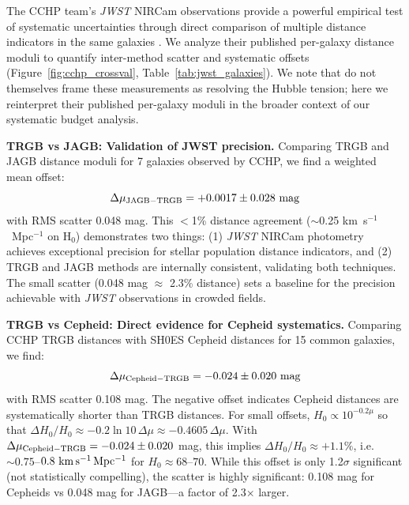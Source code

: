 \documentclass[preprint, linenumbers]{aastex701}
\begin{document}
The CCHP team's \textit{JWST} NIRCam observations provide a powerful empirical test of systematic uncertainties through direct comparison of multiple distance indicators in the same galaxies \citep{Freedman2025a}. We analyze their published per-galaxy distance moduli to quantify inter-method scatter and systematic offsets (Figure~\ref{fig:cchp_crossval}, Table~\ref{tab:jwst_galaxies}). We note that \citet{Freedman2025a} do not themselves frame these measurements as resolving the Hubble tension; here we reinterpret their published per-galaxy moduli in the broader context of our systematic budget analysis.

\textbf{TRGB vs JAGB: Validation of JWST precision.} Comparing TRGB and JAGB distance moduli for 7 galaxies observed by CCHP, we find a weighted mean offset:
\begin{equation}
\Delta\mu_{\rm JAGB-TRGB} = +0.0017 \pm 0.028~{\rm mag}
\end{equation}
with RMS scatter 0.048 mag. This $<$1\% distance agreement ($\sim$0.25 km~s$^{-1}$~Mpc$^{-1}$ on H$_0$) demonstrates two things: (1) \textit{JWST} NIRCam photometry achieves exceptional precision for stellar population distance indicators, and (2) TRGB and JAGB methods are internally consistent, validating both techniques. The small scatter (0.048 mag $\approx$ 2.3\% distance) sets a baseline for the precision achievable with \textit{JWST} observations in crowded fields.

\textbf{TRGB vs Cepheid: Direct evidence for Cepheid systematics.} Comparing CCHP TRGB distances with SH0ES Cepheid distances for 15 common galaxies, we find:
\begin{equation}
\Delta\mu_{\rm Cepheid-TRGB} = -0.024 \pm 0.020~{\rm mag}
\end{equation}
with RMS scatter 0.108 mag. The negative offset indicates Cepheid distances are systematically shorter than TRGB distances. For small offsets, $H_0 \propto 10^{-0.2\mu}$ so that $\Delta H_0/H_0 \approx -0.2\ln 10\,\Delta\mu \approx -0.4605\,\Delta\mu$. With $\Delta\mu_{\rm Cepheid-TRGB}=-0.024\pm0.020$ mag, this implies $\Delta H_0/H_0 \approx +1.1\%$, i.e. $\sim0.75$--$0.8~{\rm km\,s^{-1}\,Mpc^{-1}}$ for $H_0\approx68$--$70$. While this offset is only 1.2$\sigma$ significant (not statistically compelling), the scatter is highly significant: 0.108 mag for Cepheids vs 0.048 mag for JAGB---a factor of 2.3$\times$ larger.
\end{document}
